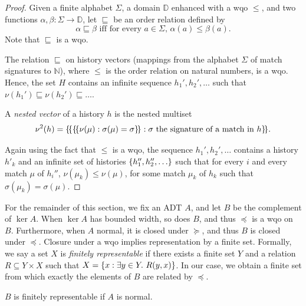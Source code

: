 \begin{proof}
Given a finite alphabet $\Sigma$, a domain $\mathbb{D}$ enhanced with a wqo $\leq$, and two functions 
$\alpha,\beta:\Sigma\rightarrow \mathbb{D}$, let $\sqsubseteq$ be an order relation defined by
\[
\alpha\sqsubseteq\beta\mbox{ iff for every $a\in \Sigma$, $\alpha(a)\leq\beta(a)$}.
\]
Note that $\sqsubseteq$ is a wqo.

The relation $\sqsubseteq$ on history vectors (mappings from the alphabet $\Sigma$ of match signatures to $\mathbb{N}$), 
where $\leq$ is the order relation on natural numbers, is a wqo.
Hence, the set $H$ contains an infinite sequence $h_1',h_2',\ldots$ such that $\nu(h_1')\sqsubseteq \nu(h_2')\sqsubseteq \ldots$.

A \emph{nested vector} of a history $h$ is the nested multiset
\[
\nu^2(h)={\{\!\{ {\{\!\{ \nu(\mu): \sigma(\mu)=\sigma \}\!\}} : \sigma\mbox{ the signature of a match in $h$} \}\!\}}.
\]


Again using the fact that $\leq$ is a wqo, the sequence $h_1',h_2',\ldots$ contains a history $h'_k$ and an infinite set of histories 
${\{{h_1'',h_2'',\ldots}\}}$ such that for every $i$ and every match $\mu$ of $h_i''$,
$\nu(\mu_k)\leq \nu(\mu)$, for some match $\mu_k$ of $h_k$ such that $\sigma(\mu_k)=\sigma(\mu)$.

\end{proof}

For the remainder of this section, we fix an ADT $A$, and let $B$ be the
complement of $\ker A$. When $\ker A$ has bounded width, so does $B$, and thus
$\preceq$ is a wqo on $B$. Furthermore, when $A$ normal, it is closed under
$\succeq$, and thus $B$ is closed under $\preceq$. Closure under a wqo implies
representation by a finite set. Formally, we say a set $X$ is \emph{finitely
representable} if there exists a finite set $Y$ and a relation $R \subseteq Y
\times X$ such that $X = {\{{ x : \exists y\in Y.\ R(y,x) }\}}$. In our case, we
obtain a finite set from which exactly the elements of $B$ are related by
$\preceq$.

\begin{lemma}

  $B$ is finitely representable if $A$ is normal.

\end{lemma}

